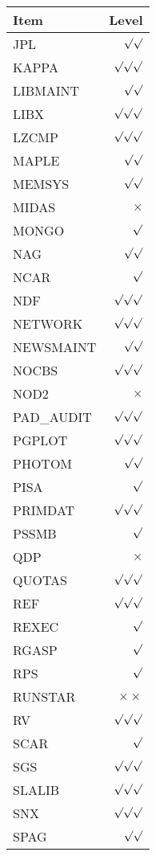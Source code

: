 \begin{center}
\begin{tabular}{||l|r||}
\hline
Item & Level \\
\hline
\hline
JPL       & $\surd\surd$ \\
KAPPA     & $\surd\surd\surd$ \\
LIBMAINT  & $\surd\surd$ \\
LIBX      & $\surd\surd\surd$ \\
LZCMP     & $\surd\surd\surd$ \\
MAPLE     & $\surd\surd$ \\
MEMSYS    & $\surd\surd$ \\
MIDAS     & $\times$ \\
MONGO     & $\surd$ \\
NAG       & $\surd\surd$ \\
NCAR      & $\surd$ \\
NDF       & $\surd\surd\surd$ \\
NETWORK   & $\surd\surd\surd$ \\
NEWSMAINT & $\surd\surd$ \\
NOCBS     & $\surd\surd\surd$ \\
NOD2      & $\times$ \\
PAD\_AUDIT & $\surd\surd\surd$ \\
PGPLOT    & $\surd\surd\surd$ \\
PHOTOM    & $\surd\surd$ \\
PISA      & $\surd$ \\
PRIMDAT   & $\surd\surd\surd$ \\
PSSMB     & $\surd$ \\
QDP       & $\times$ \\
QUOTAS    & $\surd\surd\surd$ \\
REF       & $\surd\surd\surd$ \\
REXEC     & $\surd$ \\
RGASP     & $\surd$ \\
RPS       & $\surd$ \\
RUNSTAR   & $\times\times$ \\
RV        & $\surd\surd\surd$ \\
SCAR      & $\surd$ \\
SGS       & $\surd\surd\surd$ \\
SLALIB    & $\surd\surd\surd$ \\
SNX       & $\surd\surd\surd$ \\
SPAG      & $\surd\surd$ \\

\end{tabular}
\end{center}
